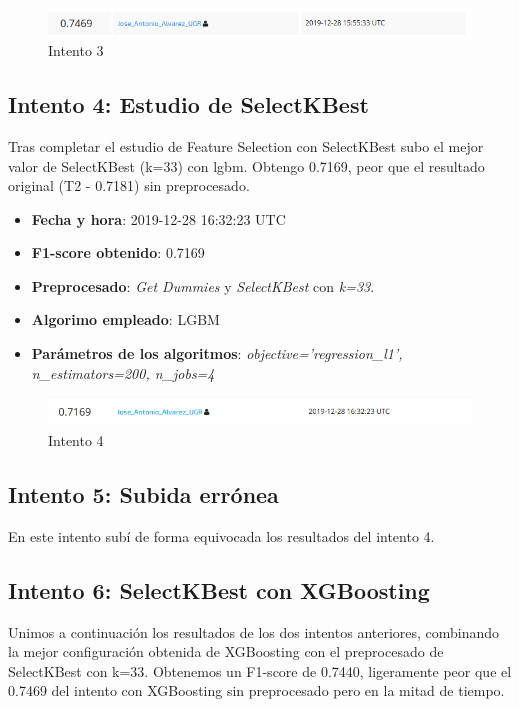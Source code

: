 \documentclass[11pt,a4paper]{article}
\begin{document}
	\begin{figure}[H] 
		\centering
		\includegraphics[scale=0.6]{../capturas/T3}
		\caption{Intento 3}
	\end{figure}
	
	\subsection{Intento 4: Estudio de SelectKBest}
	
	Tras completar el estudio de Feature Selection con SelectKBest subo el mejor valor de SelectKBest (k=33) con lgbm. Obtengo 0.7169, peor que el resultado original (T2 - 0.7181) sin preprocesado.
	
	\begin{itemize}
		\item \textbf{Fecha y hora}: 2019-12-28 16:32:23 UTC
		\item \textbf{F1-score obtenido}: 0.7169
		\item \textbf{Preprocesado}: \emph{Get Dummies} y \emph{SelectKBest} con \emph{k=33}.
		\item \textbf{Algorimo empleado}: LGBM
		\item \textbf{Parámetros de los algoritmos}: \emph{objective='regression\_l1', n\_estimators=200, n\_jobs=4}
	\end{itemize}
	
	\begin{figure}[H] 
		\centering
		\includegraphics[scale=0.6]{../capturas/T4}
		\caption{Intento 4}
	\end{figure}
	
	\subsection{Intento 5: Subida errónea}
	
	En este intento subí de forma equivocada los resultados del intento 4.
	
	\subsection{Intento 6: SelectKBest con XGBoosting}
	
	Unimos a continuación los resultados de los dos intentos anteriores, combinando la mejor configuración obtenida de XGBoosting con el preprocesado de SelectKBest con k=33. Obtenemos un F1-score de 0.7440, ligeramente peor que el 0.7469 del intento con XGBoosting sin preprocesado pero en la mitad de tiempo. \\
	
\end{document}

